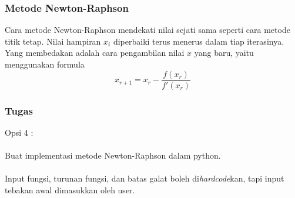 \documentclass{beamer}
\begin{document}

\begin{frame}
\frametitle{Metode Newton-Raphson}
Cara metode Newton-Raphson mendekati nilai sejati sama seperti cara metode titik tetap. Nilai hampiran $x_i$ diperbaiki terus menerus dalam tiap iterasinya. Yang membedakan adalah cara pengambilan nilai $x$ yang baru, yaitu menggunakan formula
\begin{equation}
x_{r+1}  =x_r - \dfrac{f(x_r)}{f'(x_r)}
\nonumber
\end{equation}
\end{frame}


\begin{frame}
\frametitle{Tugas}
Opsi 4 :\\\ \\
Buat implementasi metode Newton-Raphson dalam python. \\\ \\Input fungsi, turunan fungsi, dan batas galat boleh di\textit{hardcode}kan, tapi input tebakan awal dimasukkan oleh user. 
\end{frame}

\end{document}
